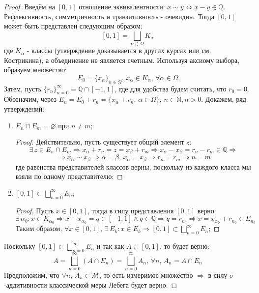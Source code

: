 \documentclass[12pt]{article}
\newcommand{\MQ}{\mathbb{Q}}
\newcommand{\MN}{\mathbb{N}}
\newcommand{\MM}{\mathcal{M}}
\newcommand{\VN}{\varnothing}
\theoremstyle{definition}
\begin{document}
\begin{proof}
	Введём на $[0,1]$ отношение эквивалентности: $x \sim y \Leftrightarrow x - y \in \MQ$. Рефлексивность, симметричность и транзитивность - очевидны. Тогда $[0,1]$ может быть представлен следующим образом: 
	$$
		[0,1] = \bigsqcup\limits_{\alpha \in \Omega}K_\alpha
	$$
	где $K_\alpha$ - классы (утверждение доказывается в других курсах или см. Кострикина), а объединение не является счетным. Используя аксиому выбора, образуем множество: 
	$$
		E_0 = \{x_\alpha\}_{\alpha \in \Omega}, \, x_\alpha \in K_\alpha, \, \forall \alpha \in \Omega
	$$ 
	Затем, пусть $\{r_n\}_{n = 0}^{\infty} = \MQ \cap [-1,1]$, где для удобства будем считать, что $r_0 = 0$. Обозначим, через $E_n = E_0 + r_n = \{x_\alpha + r_n, \, \alpha \in \Omega\}, \, n \in \MN, n > 0$. Докажем, ряд утверждений:
	\begin{enumerate}[label = \arabic*)]
		\item $E_n \cap E_m = \VN$ при $n \neq m$; 
		\begin{proof}
			Действительно, пусть существует общий элемент $z$:
			$$
				\exists \, z \in E_n \cap E_m \Rightarrow x_\alpha + r_n  = z = x_\beta + r_m \Rightarrow x_\alpha - x_\beta = r_n - r_m \in \MQ \Rightarrow 
			$$
			$$
				\Rightarrow x_\alpha \sim x_\beta \Rightarrow \alpha = \beta, \, x_\alpha = x_\beta \Rightarrow r_n = r_m \Rightarrow n = m
			$$
			где равенства представителей классов верны, поскольку из каждого класса мы взяли по одному представителю;
		\end{proof}
		\item $[0,1] \subset \bigsqcup\limits_{n = 0 }^{\infty}E_n$;
		\begin{proof}
			Пусть $x \in [0,1]$, тогда в силу представления $[0,1]$ верно: 
			$$
				\exists \, \alpha_0 \colon x \in K_{\alpha_0} \Rightarrow x - x_{\alpha_0} = q  \in [-1,1] \wedge q \in \MQ \Rightarrow q = r_{n_0} \Rightarrow x = x_{\alpha_0} + r_{n_0} \in E_{n_0}
			$$
			Таким образом, $\forall x \in [0,1], \, \exists \, E_k \colon x \in E_k \Rightarrow [0,1] \subset \bigsqcup\limits_{n = 0 }^{\infty}E_n$;
		\end{proof}
	\end{enumerate}
	Поскольку $[0,1] \subset \bigsqcup\limits_{n = 0 }^{\infty}E_n$ и так как $A \subset [0,1]$, то будет верно: 
	$$
		A = \bigsqcup\limits_{n = 0 }^{\infty}(A \cap E_n) = \bigsqcup\limits_{n = 0 }^{\infty}A_n, \, \forall n, \, A_n = A \cap E_n
	$$
	Предположим, что $\forall n, \, A_n \in \MM$, то есть измеримое множество $\Rightarrow$ в силу $\sigma$-аддитивности классической меры Лебега будет верно:

\end{proof}
\end{document}
